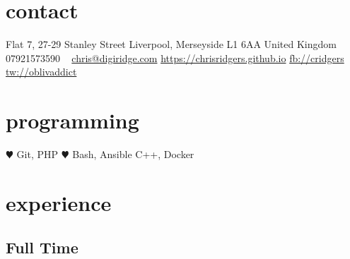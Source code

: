 \documentclass[]{friggeri-cv} %
\begin{document}


\begin{aside} %
\section{contact}
Flat 7, 27-29 Stanley Street
Liverpool, Merseyside L1 6AA
United Kingdom
~
07921573590
~
\href{mailto:chris@digiridge.com}{chris@digiridge.com}
\href{https://chrisridgers.github.io}{https://chrisridgers.github.io}
\href{https://www.facebook.com/chrisridgers}{fb://cridgers}
\href{http://twitter.com/oblivaddict}{tw://oblivaddict}
\section{programming}
{\large \color{red} $\varheartsuit$} Git, PHP
{\color{red} $\varheartsuit$} Bash, Ansible
C++, Docker 
\end{aside}


\section{experience}

\subsection{Full Time}
\end{document}
